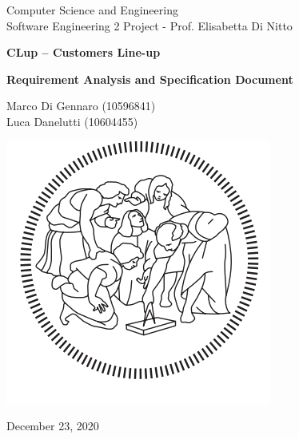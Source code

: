 \documentclass[10pt,openany]{book}
\begin{document}
\begin{titlepage}
    \clearpage
    \thispagestyle{empty}
	\centering
	\vspace{2cm}

	{\normalsize  Computer Science and Engineering\\Software Engineering 2 Project - Prof. Elisabetta Di Nitto\par}
	\vspace{3cm}
	{\Huge \textbf{CLup – Customers Line-up}} \\
	\vspace{1cm}
	{\large \textbf{Requirement Analysis and Specification
    Document} \par}
	\vspace{4cm}
	{\normalsize Marco Di Gennaro (10596841)\\Luca Danelutti (10604455)  \par}
	\vspace{2cm}

    \includegraphics[scale=0.4]{Logo_Politecnico_Milano.png}
    
    \vspace{2cm}

	{\normalsize December 23, 2020 \par}
	
	\pagebreak

\end{titlepage}

\tableofcontents{}

\clearpage
\thispagestyle{empty}

\mainmatter
\end{document}
